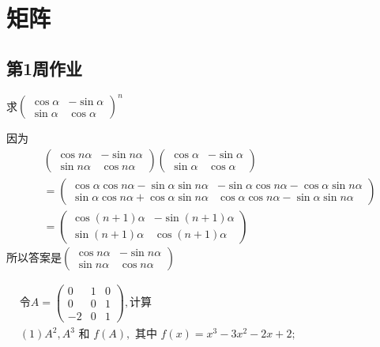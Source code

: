 \chapter{矩阵}
\newpage
\section{第1周作业}
\begin{example}{}{}
    求$\left( \begin{matrix} \cos \alpha&- \sin \alpha \\ \sin \alpha& \cos \alpha \end{matrix} \right)^{n}$
\end{example}
\begin{solution}
    因为\begin{align*}&\left( \begin{matrix} \cos n\alpha&- \sin n\alpha \\ \sin n\alpha& \cos n\alpha \end{matrix} \right)\left( \begin{matrix} \cos \alpha&- \sin \alpha \\ \sin \alpha& \cos \alpha \end{matrix} \right)\\&=\left( \begin{matrix} \cos\alpha\cos n\alpha-\sin \alpha\sin n\alpha &-\sin\alpha\cos n\alpha-\cos\alpha\sin n\alpha \\ \sin\alpha\cos n\alpha+\cos\alpha\sin n\alpha& \cos\alpha\cos n\alpha-\sin \alpha\sin n\alpha \end{matrix} \right)\\&=\left( \begin{matrix} \cos (n+1)\alpha&- \sin (n+1)\alpha \\ \sin (n+1)\alpha& \cos (n+1)\alpha \end{matrix} \right)\end{align*}所以答案是$\left( \begin{matrix} \cos n\alpha&- \sin n\alpha \\ \sin n\alpha& \cos n\alpha \end{matrix} \right)$
\end{solution}
\begin{example}{}{}
    $\begin{aligned}&\text{令}A=\begin{pmatrix}0&1&0\\0&0&1\\-2&0&1\end{pmatrix},\text{计算}\\&(1)A^2,A^3\text{ 和 }f(A),\text{ 其中 }f(x)=x^3-3x^2-2x+2;\end{aligned}$
\end{example}
